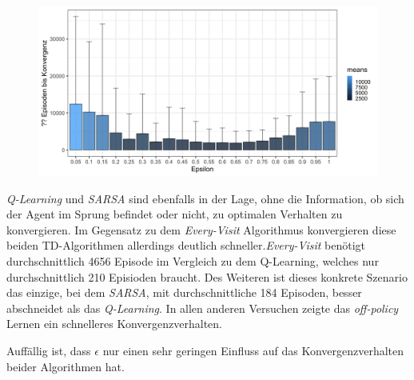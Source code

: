 \begin{figure}[H]
  \centering
  \includegraphics[width=\textwidth]{images/SimpleNoJumpEveryVisitMCA}
  \label{fig:test1}
\end{figure}
 
\textit{Q-Learning} und \textit{SARSA} sind ebenfalls in der Lage, ohne die Information, ob sich der Agent im Sprung befindet oder nicht, zu optimalen Verhalten zu konvergieren. Im Gegensatz zu dem \textit{Every-Visit} Algorithmus konvergieren diese beiden TD-Algorithmen allerdings deutlich schneller.\textit{Every-Visit} benötigt durchschnittlich 4656 Episode im Vergleich zu dem {Q-Learning}, welches nur durchschnittlich 210 Episioden braucht. Des Weiteren ist dieses konkrete Szenario das einzige, bei dem \textit{SARSA}, mit durchschnittliche 184 Episoden, besser abschneidet als das \textit{Q-Learning}. In allen anderen Versuchen zeigte das \textit{off-policy} Lernen ein schnelleres Konvergenzverhalten.
\par 
Auffällig ist, dass $\epsilon$ nur einen sehr geringen Einfluss auf das Konvergenzverhalten beider Algorithmen hat. 

